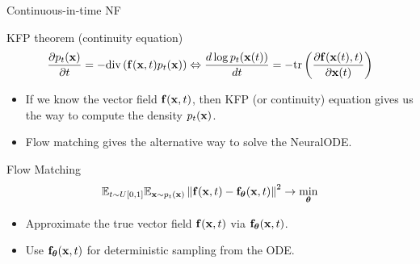 \begin{frame}{Continuous-in-time NF}
	\begin{block}{KFP theorem (continuity equation)}
		\vspace{-0.5cm}
		\[
			\frac{\partial p_t(\mathbf{x})}{\partial t} = - \text{div}\left(\mathbf{f}(\mathbf{x}, t) p_t(\mathbf{x})\right) \Leftrightarrow \frac{d \log p_t(\mathbf{x}(t))}{d t} = - \text{tr} \left( \frac{\partial \mathbf{f}(\mathbf{x}(t), t)}{\partial \mathbf{x}(t)} \right)
		\]
		\vspace{-0.3cm}
	\end{block}
	\begin{itemize}
		\item If we know the vector field $\mathbf{f} (\mathbf{x}, t)$, then KFP (or continuity) equation gives us the way to compute the density $p_t(\mathbf{x})$.
		\item Flow matching gives the alternative way to solve the NeuralODE.
	\end{itemize}
	\begin{block}{Flow Matching}
		\vspace{-0.3cm}
		\[
			\mathbb{E}_{t \sim U[0, 1]} \mathbb{E}_{\mathbf{x} \sim p_t(\mathbf{x})}\left\| \mathbf{f}(\mathbf{x}, t) - \mathbf{f}_{\boldsymbol{\theta}}(\mathbf{x}, t) \right\|^2 \rightarrow \min_{\boldsymbol{\theta}}
		\]
		\vspace{-0.3cm}
	\end{block}
	\begin{itemize}
		\item Approximate the true vector field $\mathbf{f} (\mathbf{x}, t)$ via $\mathbf{f}_{\boldsymbol{\theta}}(\mathbf{x}, t)$.
		\item Use $\mathbf{f}_{\boldsymbol{\theta}}(\mathbf{x}, t)$ for deterministic sampling from the ODE.
	\end{itemize}
\end{frame}
